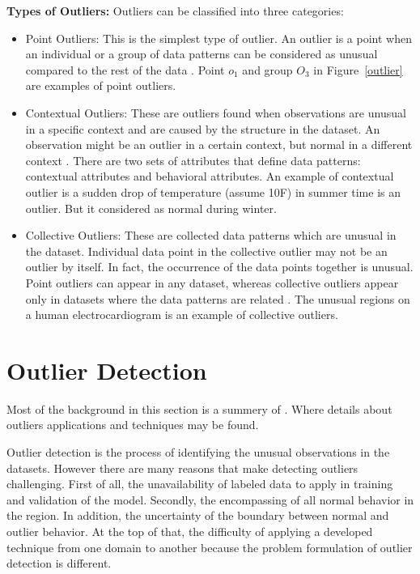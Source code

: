 \textbf{Types of Outliers:}
Outliers can be classified into three categories:
\begin{itemize}
\item{Point Outliers:} This is the simplest type of outlier. An outlier is a point when an individual or a group of data patterns can be considered as unusual compared to the rest of the data \citep{Outlier}. Point $o_1$ and group $O_3$ in Figure~\ref{outlier} are examples of point outliers.
\item{Contextual Outliers:} 
These are outliers found when observations are unusual in a specific context and are caused by the structure in the dataset. An observation might be an outlier in a certain context, but normal in a different context \citep{Kurukshetra}. There are two sets of attributes that define data patterns: contextual attributes and behavioral attributes. An example of contextual outlier is a sudden drop of temperature (assume 10F) in summer time is an outlier. But it considered as normal during winter.  
\item{Collective Outliers:}
These are collected data patterns which are unusual in the dataset. Individual data point in the collective outlier may not be an outlier by itself. In fact, the occurrence of the data points together is unusual. Point outliers can appear in any dataset, whereas collective outliers appear only in datasets where the data patterns are related \citep{Kurukshetra}. The unusual regions on a human electrocardiogram is an example of collective outliers.
\end{itemize}
\vspace{-2mm}
\section{Outlier Detection}
\vspace{-2mm}
Most of the background in this section is a summery of \citep{Kurukshetra}. Where details about outliers applications and techniques may be found.

Outlier detection is the process of identifying the unusual observations in the datasets. However there are many reasons that make detecting outliers challenging. First of all, the unavailability of labeled data to apply in training and validation of the model. Secondly, the encompassing of all normal behavior in the region. In addition, the uncertainty of the boundary between normal and outlier behavior. At the top of that, the difficulty of applying a developed technique from one domain to another because the problem formulation of outlier detection is different.

